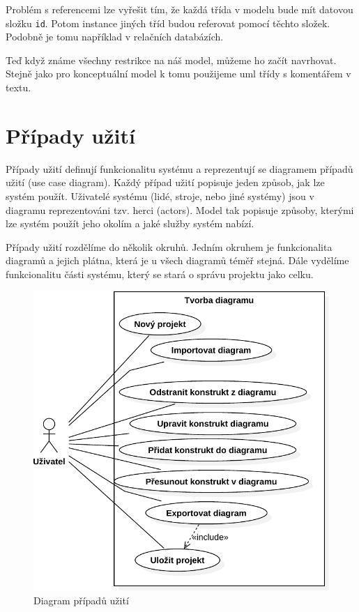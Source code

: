 Problém s referencemi lze vyřešit tím, že každá třída v modelu bude mít datovou složku \texttt{id}.
Potom instance jiných tříd budou referovat pomocí těchto složek.
Podobně je tomu například v relačních databázích.

Teď když známe všechny restrikce na náš model, můžeme ho začít navrhovat.
Stejně jako pro konceptuální model k tomu použijeme \acrshort{uml} třídy s komentářem v textu.

\section{Případy užití}

Případy užití definují funkcionalitu systému a reprezentují se diagramem případů užití (use case diagram).
Každý případ užití popisuje jeden způsob, jak lze systém použít.
Uživatelé systému (lidé, stroje, nebo jiné systémy) jsou v diagramu reprezentováni tzv. herci (actors).
Model tak popisuje způsoby, kterými lze systém použít jeho okolím a jaké služby systém nabízí.~\cite[s.~65]{overgaard_usecases_2005}

Případy užití rozdělíme do několik okruhů.
Jedním okruhem je funkcionalita diagramů a jejich plátna, která je u všech diagramů téměř stejná.
Dále vydělíme funkcionalitu části systému, který se stará o správu projektu jako celku.

\begin{figure}[!htb]
  \centering
  \includegraphics[width=\maxwidth{0.7\textwidth}]{../img/diagrams/use-case-diagram.pdf}
  \caption{Diagram případů užití}
  \label{fig:use-case-diagram}
\end{figure}
